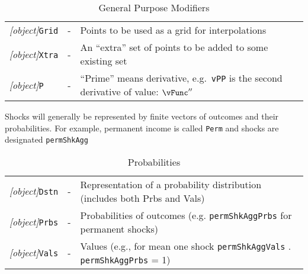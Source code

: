 \documentclass[12pt]{\econtex}
\begin{document}
\begin{table}[ht]
\begin{tabular}{|>{\ttfamily}lcl|}
    \\ \textit{[object]}\texttt{Grid} & - & Points to be used as a grid for interpolations
    \\ \textit{[object]}\texttt{Xtra} & - & An ``extra'' set of points to be added to some existing set
\\ \textit{[object]}\texttt{P} & - & ``Prime'' means derivative, e.g.\ \texttt{vPP} is the second derivative of value: $\vFunc^{\prime\prime}$
\\    \hline
  \end{tabular}
  \caption{General Purpose Modifiers}
  \label{table:General}
\end{table}	

\begin{comment}
\hypertarget{Stability-Points}{}
\section{Stability Points}
\begin{table}[ht]
\centering
  \begin{tabular}{|>{\ttfamily}lcl|} \hline 
     \textit{[object]}\texttt{BalGro} & - & Value of variable at a balanced growth point
    \\ \textit{[object]}\texttt{Target} & - & The `target' value of a variable \\ \hline
  \end{tabular}
  \caption{Points of Stability}
  \label{table:Stability}
\end{table}	
\end{comment}

\medskip\medskip
\hypertarget{Shocks}{}
Shocks will generally be represented by finite vectors of outcomes and their probabilities.  For example, permanent income is called \texttt{Perm} and shocks are designated \texttt{permShkAgg}
\begin{table}[ht]
  \centering
  \begin{tabular}{|>{\ttfamily}ccl|} 		
    \hline
    \textit{[object]}\texttt{Dstn} & - & Representation of a probability distribution (includes both Prbs and Vals)
    \\ \textit{[object]}\texttt{Prbs} & - & Probabilities of outcomes (e.g. \texttt{permShkAggPrbs} for permanent shocks) 
    \\ \textit{[object]}\texttt{Vals} & - & Values (e.g., for mean one shock \texttt{permShkAggVals} . \texttt{permShkAggPrbs} = 1)                                            
    \\ 	\hline
  \end{tabular}
  \caption{Probabilities}
  \label{table:Probabilities}
\end{table}	
\end{document}
